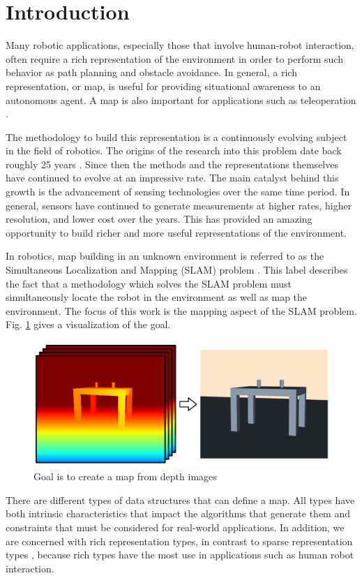 
\section{Introduction} \label{sec:introduction}

Many robotic applications, especially those that involve human-robot
interaction, often require a rich representation of the environment in order to
perform such behavior as path planning and obstacle avoidance. In general, a
rich representation, or map, is useful for providing situational awareness to an
autonomous agent. A map is also important for applications such as teleoperation
\cite{Kadous2006}.

The methodology to build this representation is a continuously evolving subject
in the field of robotics. The origins of the research into this problem date
back roughly 25 years \cite{Lorensen1987}. Since then the methods and the
representations themselves have continued to evolve at an impressive rate. The
main catalyst behind this growth is the advancement of sensing technologies over
the same time period. In general, sensors have continued to generate
measurements at higher rates, higher resolution, and lower cost over the years.
This has provided an amazing opportunity to build richer and more useful
representations of the environment.

In robotics, map building in an unknown environment is referred to as
the Simultaneous Localization and Mapping (SLAM) problem \cite{Thrun2002}. This label
describes the fact that a methodology which solves the SLAM problem must
simultaneously locate the robot in the environment as well as map the
environment. The focus of this work is the mapping aspect of the SLAM problem. Fig. \ref{fig:goal} gives a visualization of the goal.

\begin{figure}[h]%
\centering
\includegraphics[width=.5\textwidth]{figures/diagram_goal.png}
\caption{Goal is to create a map from depth images}
\label{fig:goal}
\end{figure}

There are different types of data structures that can define a map. All types have both
intrinsic characteristics that impact the algorithms that generate them and
constraints that must be considered for real-world applications. In
addition, we are concerned with rich representation types, in contrast to sparse
representation types \cite{Dissanayake2001}, because rich types have the most
use in applications such as human robot interaction.

